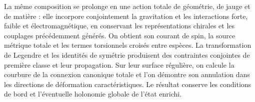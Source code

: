 La même composition se prolonge en une action totale de géométrie, de jauge et de matière : elle incorpore conjointement la gravitation et les interactions forte, faible et électromagnétique, en conservant les représentations chirales et les couplages précédemment générés. On obtient son courant de spin, la source métrique totale et les termes torsionnels croisés entre espèces. La transformation de Legendre et les identités de symétrie produisent des contraintes conjointes de première classe et leur propagation. Sur leur surface régulière, on calcule la courbure de la connexion canonique totale et l’on démontre son annulation dans les directions de déformation caractéristiques. Le résultat conserve les conditions de bord et l’éventuelle holonomie globale de l’état enrichi.

